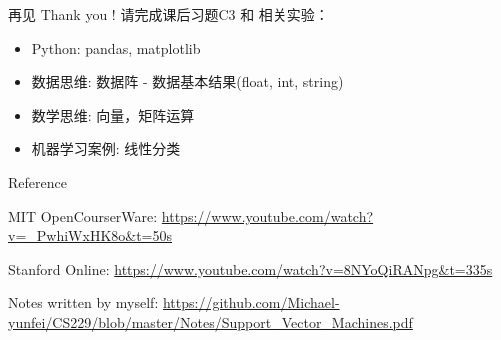 \documentclass[handout]{ctexbeamer}
\begin{document}
\begin{frame}{再见}
	Thank you !  请完成课后习题C3 和 相关实验：
	\begin{itemize}
		\item Python: pandas, matplotlib
		\item 数据思维: 数据阵 - 数据基本结果(float, int, string)
		\item 数学思维: 向量，矩阵运算
		\item 机器学习案例: 线性分类
	\end{itemize}
\end{frame}



\begin{frame}[allowframebreaks]{Reference}
  
  
  MIT OpenCourserWare: \url{https://www.youtube.com/watch?v=_PwhiWxHK8o&t=50s} 
  
  Stanford Online: \url{https://www.youtube.com/watch?v=8NYoQiRANpg&t=335s}
  
  Notes written by myself: \url{https://github.com/Michael-yunfei/CS229/blob/master/Notes/Support_Vector_Machines.pdf} 
\end{frame}
\end{document}
